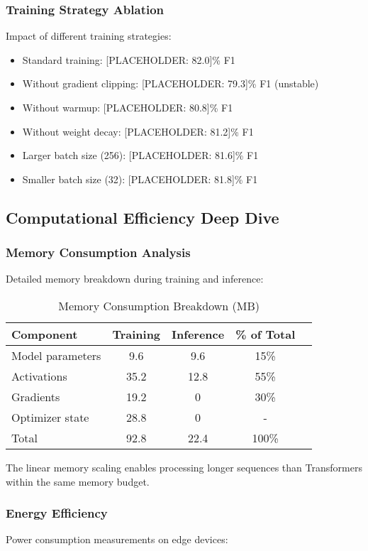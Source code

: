 \documentclass[journal]{IEEEtran}
\begin{document}
\subsubsection{Training Strategy Ablation}
Impact of different training strategies:

\begin{itemize}
\item Standard training: [PLACEHOLDER: 82.0]\% F1
\item Without gradient clipping: [PLACEHOLDER: 79.3]\% F1 (unstable)
\item Without warmup: [PLACEHOLDER: 80.8]\% F1
\item Without weight decay: [PLACEHOLDER: 81.2]\% F1
\item Larger batch size (256): [PLACEHOLDER: 81.6]\% F1
\item Smaller batch size (32): [PLACEHOLDER: 81.8]\% F1
\end{itemize}

\subsection{Computational Efficiency Deep Dive}

\subsubsection{Memory Consumption Analysis}
Detailed memory breakdown during training and inference:

\begin{table}[h]
\centering
\caption{Memory Consumption Breakdown (MB)}
\begin{tabular}{lcccc}
\toprule
Component & Training & Inference & \% of Total \\
\midrule
Model parameters & 9.6 & 9.6 & 15\% \\
Activations & 35.2 & 12.8 & 55\% \\
Gradients & 19.2 & 0 & 30\% \\
Optimizer state & 28.8 & 0 & - \\
\midrule
Total & 92.8 & 22.4 & 100\% \\
\bottomrule
\end{tabular}
\end{table}

The linear memory scaling enables processing longer sequences than Transformers within the same memory budget.

\subsubsection{Energy Efficiency}
Power consumption measurements on edge devices:
\end{document}
